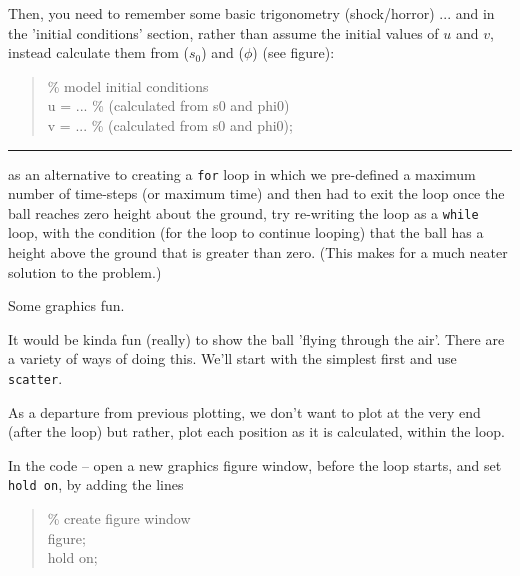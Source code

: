 \documentclass{tufte-book} %
\newenvironment{docspec}{\begin{quotation}\ttfamily\parskip0pt\parindent0pt\ignorespaces}{\end{quotation}}
\begin{document}
Then, you need to remember some basic trigonometry (shock/horror) ... and in the 'initial conditions' section, rather than assume the initial values of \(u\) and \(v\), instead calculate them from (\(s_{0}\)) and (\(\phi\)) (see figure):
\vspace{-1mm}\begin{docspec}
\textcolor[rgb]{0,0.501961,0}{\% model initial conditions}\\
u = ... \textcolor[rgb]{0,0.501961,0}{\% (calculated from s0 and phi0)}\\
v = ... \textcolor[rgb]{0,0.501961,0}{\% (calculated from s0 and phi0)};
\end{docspec}\vspace{-1mm}

\vspace{1mm}
\noindent\rule{4cm}{0.5pt}
\vspace{2mm}

\vspace{-4mm}
 as an alternative to creating a \texttt{for} loop in which we pre-defined a maximum number of time-steps (or maximum time) and then  had to exit the loop once the ball reaches zero height about the ground, try re-writing the loop as a \texttt{while} loop, with the condition (for the loop to continue looping) that the ball has a height above the ground that is greater than zero. (This makes for a much neater solution to the problem.)


\newpage

 Some graphics fun.

\vspace{1mm}
\noindent It would be kinda fun (really) to show the ball 'flying through the air'. There are a variety of ways of doing this. We'll start with the simplest first and use \texttt{scatter}.

As a departure from previous plotting, we don't want to plot at the very end (after the loop) but rather, plot each position as it is calculated, within the loop.

In the code -- open a new graphics figure window, before the loop starts, and set \texttt{hold on}, by adding the lines
\vspace{-1mm}\begin{docspec}
\textcolor[rgb]{0,0.501961,0}{\% create figure window}\\
figure;
\\hold on;
\end{docspec}\vspace{-1mm}
\end{document}
